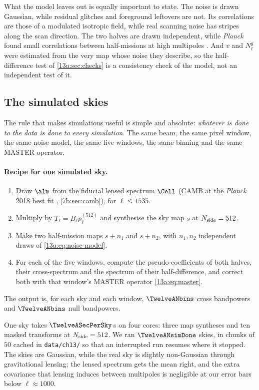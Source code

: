 What the model leaves out is equally important to state. The noise is drawn Gaussian, while residual
glitches and foreground leftovers are not. Its correlations are those of a modulated isotropic field, while
real scanning noise has stripes along the scan direction. The two halves are drawn independent, while
\textit{Planck} found small correlations between half-missions at high multipoles
\cite[§3.2.1]{Planck2018V}. And $v$ and $N^g_\ell$ were estimated from the very map whose noise they describe, so
the half-difference test of \cref{13a:sec:checks} is a consistency check of the model, not an independent test of
it.

\subsection{The simulated skies}
\label{13a:sec:simrecipe}

The rule that makes simulations useful is simple and absolute: \emph{whatever is done to the data is done to
every simulation}. The same beam, the same pixel window, the same noise model, the same five windows, the same
binning and the same MASTER operator.

\paragraph{Recipe for one simulated sky.}
\begin{enumerate}[itemsep=1pt,leftmargin=1.4em]
  \item Draw $\alm$ from the fiducial lensed spectrum $\Cell$ (CAMB at the \textit{Planck} 2018 best fit
        \cite{CAMB2000}, \cref{7b:sec:camb}), for $\ell\le1535$.
  \item Multiply by $T_\ell=B_\ell p^{(512)}_\ell$ and synthesise the sky map $s$ at $N_{\rm side}=512$.
  \item Make two half-mission maps $s+n_1$ and $s+n_2$, with $n_1,n_2$ independent draws of \eqref{13a:eq:noise-model}.
  \item For each of the five windows, compute the pseudo-coefficients of both halves, their cross-spectrum and
        the spectrum of their half-difference, and correct both with that window's MASTER operator
        \eqref{13a:eq:master}.
\end{enumerate}
The output is, for each sky and each window, $\TwelveANbins$ cross bandpowers and $\TwelveANbins$ null bandpowers.

One sky takes $\TwelveASecPerSky$\,s on four cores: three map syntheses and ten masked transforms at
$N_{\rm side}=512$. We ran $\TwelveANsimDone$ skies, in chunks of $50$ cached in \texttt{data/ch13/} so that an
interrupted run resumes where it stopped. The skies are Gaussian, while the real sky is slightly non-Gaussian
through gravitational lensing; the lensed spectrum gets the mean right, and the extra covariance that lensing
induces between multipoles is negligible at our error bars below $\ell\approx1000$.

